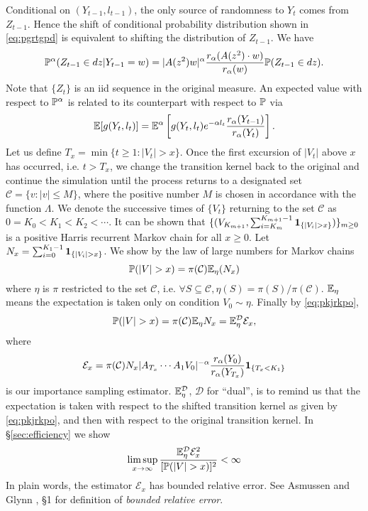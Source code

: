 Conditional on $(Y_{t-1}, l_{t-1})$, the only source of randomness to
$Y_t$ comes from $Z_{t-1}$. Hence the shift of conditional probability
distribution shown in \eqref{eq:pgrtgpd} is equivalent to shifting the
distribution of $Z_{t-1}$. We have
\[
\P^\alpha (Z_{t-1} \in dz | Y_{t-1} = w) = |A(z^2) w|^\alpha {
  r_\alpha(A(z^2) \cdot w) \over r_\alpha(w)
} \P(Z_{t-1} \in dz).
\]
Note that $\{Z_t\}$ is an iid sequence in the original measure.
An expected value with respect to $\P^\alpha$ is related to its
counterpart with respect to $\P$ via
\begin{equation}
  \label{eq:pkjrkpo}
  \E [g(Y_t, l_t)] = \E^\alpha \left[
    g(Y_t, l_t) e^{-\alpha l_t} {r_\alpha(Y_{t-1}) \over r_\alpha(Y_t)}
    \right].
\end{equation}
Let us define $T_x = \min\{t \geq 1: |V_t| > x\}$. 
Once the first excursion of $|V_t|$ above $x$ has occurred, i.e.
$t > T_x$, we change the transition kernel back to the original and
continue the simulation until the process returns to a designated set
$\mathcal C = \{v: |v| \leq M\}$, where
the positive number $M$ is chosen in accordance with the function
$\Lambda$. We denote the successive times of $\{V_t\}$ returning to the
set $\mathcal C$ as $0 = K_0  < K_1 < K_2 < \cdots$. It can be shown that
$\{(V_{K_{m+1}}, \sum_{i=K_m}^{K_{m+1} - 1} \1{|V_i| > x})\}_{m \geq 0}$
is a positive Harris recurrent Markov chain for all $x \geq 0$.
Let $N_x = \sum_{i=0}^{K_1 - 1} \1{|V_i| > x}$. We show by the law of large
numbers for Markov chains
\[
\P(|V| > x) = \pi(\mathcal C) \E_\eta(N_x)
\]
where $\eta$ is $\pi$ restricted to the set $\mathcal C$, i.e.
$\forall S \subseteq \mathcal C, \eta(S) = \pi(S)/\pi(\mathcal C)$.
$\E_\eta$ means the expectation is taken only on condition
$V_0 \sim \eta$. Finally by \eqref{eq:pkjrkpo},
\[
\P(|V| > x) = \pi(\mathcal C) \E_\eta N_x
= \E_\eta^{\mathcal D} \mathcal E_x,
\]
where
\[
\mathcal E_x
=
\pi(\mathcal C)
N_x |A_{T_x} \cdots A_1 V_0|^{-\alpha}
{r_\alpha(Y_0) \over r_\alpha(Y_{T_x})}
\1{T_x < K_1}
\]
is our importance sampling estimator. $\E_\eta^{\mathcal D}$,
$\mathcal D$ for ``dual'', is to remind us that the expectation is
taken with respect to the shifted transition kernel as given by
\eqref{eq:pkjrkpo}, and then with respect to the original transition
kernel. In \S\ref{sec:efficiency} we show
\[
\limsup_{x \to \infty} {
  \E_\eta^{\mathcal D} \mathcal E_x^2
  \over
  [\P(|V| > x)]^2
} < \infty
\]
In plain words, the estimator $\mathcal E_x$ has bounded relative
error. See Asmussen and Glynn \cite{opac-b1123521}, \S 1 for
definition of {\em bounded relative error}.
